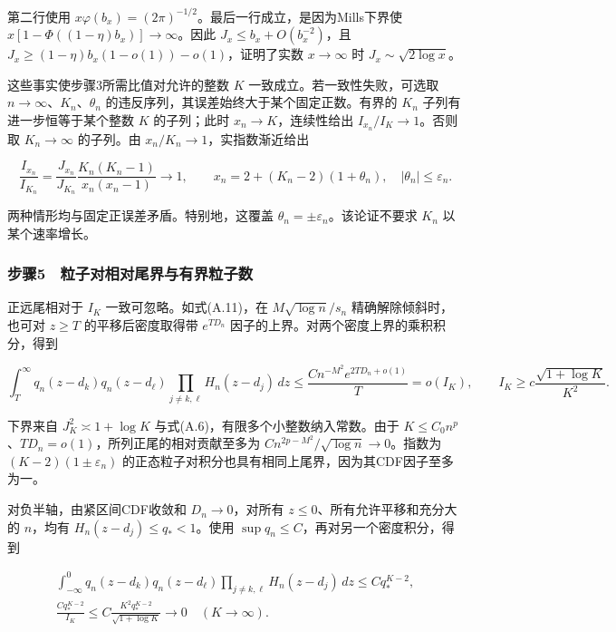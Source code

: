 \documentclass[11pt,a4paper]{article}
\begin{document}
第二行使用
\(x\varphi(b_x)=(2\pi)^{-1/2}\)。最后一行成立，是因为Mills下界使
\(x[1-\Phi((1-\eta)b_x)]\to\infty\)。因此 \(J_x\le b_x+O(b_x^{-2})\)，且
\(J_x\ge(1-\eta)b_x(1-o(1))-o(1)\)，证明了实数 \(x\to\infty\) 时
\(J_x\sim\sqrt{2\log x}\)。

这些事实使步骤3所需比值对允许的整数 \(K\) 一致成立。若一致性失败，可选取
\(n\to\infty\)、\(K_n\)、\(\theta_n\)
的违反序列，其误差始终大于某个固定正数。有界的 \(K_n\)
子列有进一步恒等于某个整数 \(K\) 的子列；此时 \(x_n\to K\)，连续性给出
\(I_{x_n}/I_K\to1\)。否则取 \(K_n\to\infty\) 的子列。由
\(x_n/K_n\to1\)，实指数渐近给出

\[
\frac{I_{x_n}}{I_{K_n}}
=\frac{J_{x_n}}{J_{K_n}}
\frac{K_n(K_n-1)}{x_n(x_n-1)}\longrightarrow1,\qquad
x_n=2+(K_n-2)(1+\theta_n),\quad |\theta_n|\le\varepsilon_n.
\]

两种情形均与固定正误差矛盾。特别地，这覆盖
\(\theta_n=\pm\varepsilon_n\)。该论证不要求 \(K_n\) 以某个速率增长。

\subsubsection*{步骤5　粒子对相对尾界与有界粒子数}\label{ux6b65ux9aa45-ux7c92ux5b50ux5bf9ux76f8ux5bf9ux5c3eux754cux4e0eux6709ux754cux7c92ux5b50ux6570}

正远尾相对于 \(I_K\) 一致可忽略。如式(A.11)，在 \(M\sqrt{\log n}/s_n\)
精确解除倾斜时，也可对 \(z\ge T\) 的平移后密度取得带 \(e^{TD_n}\)
因子的上界。对两个密度上界的乘积积分，得到

\[
\int_T^\infty q_n(z-d_k)q_n(z-d_\ell)
\prod_{j\ne k,\ell}H_n(z-d_j)\,dz
\le \frac{C n^{-M^2}e^{2TD_n+o(1)}}{T}=o(I_K),\qquad
I_K\ge c\frac{\sqrt{1+\log K}}{K^2}.
\]

下界来自 \(J_K^2\asymp1+\log K\) 与式(A.6)，有限多个小整数纳入常数。由于
\(K\le C_0n^p\)、\(TD_n=o(1)\)，所列正尾的相对贡献至多为
\(C n^{2p-M^2}/\sqrt{\log n}\to0\)。指数为 \((K-2)(1\pm\varepsilon_n)\)
的正态粒子对积分也具有相同上尾界，因为其CDF因子至多为一。

对负半轴，由紧区间CDF收敛和 \(D_n\to0\)，对所有
\(z\le0\)、所有允许平移和充分大的 \(n\)，均有
\(H_n(z-d_j)\le q_*<1\)。使用
\(\sup q_n\le C\)，再对另一个密度积分，得到

\[
\begin{gathered}
\int_{-\infty}^0q_n(z-d_k)q_n(z-d_\ell)
\prod_{j\ne k,\ell}H_n(z-d_j)\,dz\le Cq_*^{K-2},\\
\frac{Cq_*^{K-2}}{I_K}
\le C\frac{K^2q_*^{K-2}}{\sqrt{1+\log K}}\longrightarrow0
\quad(K\longrightarrow\infty).
\end{gathered}
\]
\end{document}
